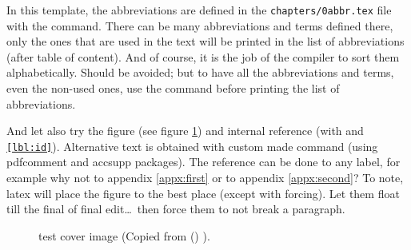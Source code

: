 In this template, the abbreviations are defined in the \texttt{chapters/0abbr.tex} file with the \texttt{} command. There can be many abbreviations and terms defined there, only the ones that are used in the text will be printed in the list of abbreviations (after table of content). And of course, it is the job of the compiler to sort them alphabetically. Should be avoided; but to have all the abbreviations and terms, even the non-used ones, use the \texttt{\glsaddall} command before printing the list of abbreviations.


And let also try the figure (see figure \ref{fig:latex-cover}) and internal reference (with \texttt{\label{lbl:id}} and \texttt{\ref{lbl:id}}). Alternative text is obtained with custom made \texttt{} command (using pdfcomment and accsupp packages). The reference can be done to any label, for example why not to appendix \ref{appx:first} or to appendix \ref{appx:second}? To note, \gls{latex} will place the figure to the best place (except with forcing). Let them float till the final of final edit\ldots ~then force them to not break a paragraph.%

\begin{figure}[ht]
  \centering
  \caption{\gls{test} cover image (Copied from \citeauthor{wikibooks:latex} () \cite{wikibooks:latex}).}
  \label{fig:latex-cover}
\end{figure}

